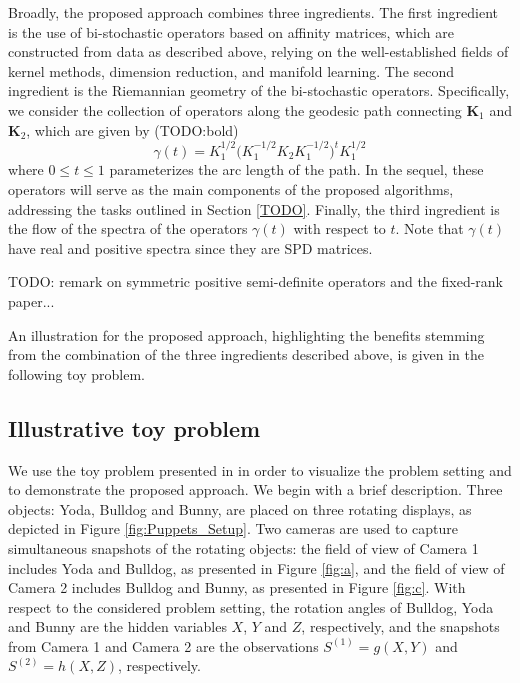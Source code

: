 \documentclass[]{article}
\theoremstyle{definition}
\begin{document}
Broadly, the proposed approach combines three ingredients. 
The first ingredient is the use of bi-stochastic operators based on affinity matrices, which are constructed from data as described above, relying on the well-established fields of kernel methods, dimension reduction, and manifold learning.
%
The second ingredient is the Riemannian geometry of the bi-stochastic operators. Specifically, we consider the collection of operators along the geodesic path connecting $\mathbf{K}_1$ and $\mathbf{K}_2$, which are given by (TODO:bold)
\begin{equation}
	\gamma(t)= K_1^{1/2}\big( K_1^{-1/2}K_2K_1^{-1/2} )^t K_1^{1/2}
\end{equation}
where $0\leq t \leq1$ parameterizes the arc length of the path. In the sequel, these operators will serve as the main components 
of the proposed algorithms, addressing the tasks outlined in Section \ref{TODO}.
%
Finally, the third ingredient is the flow of the spectra of the operators $\gamma(t)$ with respect to $t$. Note that $\gamma(t)$ have real and positive spectra since they are SPD matrices.

TODO: remark on symmetric positive semi-definite operators and the fixed-rank paper...

An illustration for the proposed approach, highlighting the benefits stemming from the combination of the three ingredients described above, is given in the following toy problem.
		
\subsection{Illustrative toy problem}

We use the toy problem presented in \cite{lederman2018learning} in order to visualize the problem setting and to demonstrate the proposed approach. We begin with a brief description.
%
Three objects: Yoda, Bulldog and Bunny, are placed on three rotating displays, as depicted in Figure \ref{fig:Puppets_Setup}. Two cameras are used to capture simultaneous snapshots of the rotating objects: the field of view of Camera 1 includes Yoda and Bulldog, as presented in Figure \ref{fig:a}, and the field of view of Camera 2 includes Bulldog and Bunny, as presented in Figure \ref{fig:c}.
%	
With respect to the considered problem setting, the rotation angles of Bulldog, Yoda and Bunny are the hidden variables $X$, $Y$ and $Z$, respectively, and the snapshots from Camera 1 and Camera 2 are the observations $S^{(1)} = g(X,Y)$ and $S^{(2)} = h(X,Z)$, respectively. 
\end{document}
